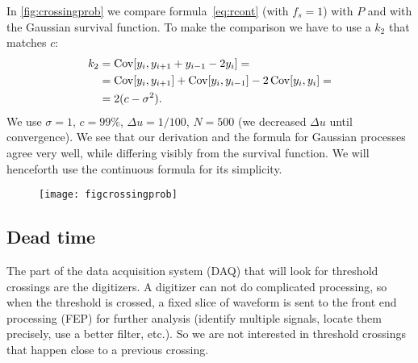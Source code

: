 In \autoref{fig:crossingprob} we compare formula~\eqref{eq:rcont} (with $f_s
= 1$) with $P$ and with the Gaussian survival function. To make the comparison
we have to use a $k_2$ that matches $c$:
%
\begin{align}
    k_2 &= \operatorname{Cov}[y_i, y_{i+1}+y_{i-1}-2y_i] = \notag \\
    &= \operatorname{Cov}[y_i,y_{i+1}]
    + \operatorname{Cov}[y_i,y_{i-1}]
    - 2 \operatorname{Cov}[y_i,y_i] = \notag \\
    &= 2 (c - \sigma^2). \label{eq:c2k2}
\end{align}
%
We use $\sigma=1$, $c = \SI{99}\%$, $\Delta u = 1/100$, $N=500$ (we decreased
$\Delta u$ until convergence). We see that our derivation and the formula
for Gaussian processes agree very well, while differing visibly from the
survival function. We will henceforth use the continuous formula for its
simplicity.


\begin{figure}
    
    \hspace{0.00\textwidth}
    \texttt{[image: figcrossingprob]}

    
\end{figure}

\subsection{Dead time}

The part of the data acquisition system (DAQ) that will look for threshold
crossings are the digitizers. A digitizer can not do complicated processing, so
when the threshold is crossed, a fixed slice of waveform is sent to the front
end processing (FEP) for further analysis (identify multiple signals, locate
them precisely, use a better filter, etc.). So we are not interested in
threshold crossings that happen close to a previous crossing.

